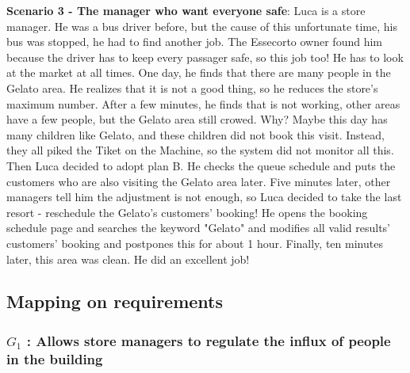 \documentclass[a4paper,12pt]{report}
\begin{document}
\textbf{Scenario 3 - The manager who want everyone safe}: Luca is a store manager. He was a bus driver before, but the cause of this unfortunate time, his bus was stopped, he had to find another job. The Essecorto owner found him because the driver has to keep every passager safe, so this job too! He has to look at the market at all times. One day, he finds that there are many people in the Gelato area. He realizes that it is not a good thing, so he reduces the store's maximum number. After a few minutes,  he finds that is not working, other areas have a few people, but the Gelato area still crowed. Why? Maybe this day has many children like Gelato, and these children did not book this visit. Instead, they all piked the Tiket on the Machine, so the system did not monitor all this. Then Luca decided to adopt plan B. He checks the queue schedule and puts the customers who are also visiting the Gelato area later. Five minutes later, other managers tell him the adjustment is not enough, so Luca decided to take the last resort - reschedule the Gelato's customers' booking! He opens the booking schedule page and searches the keyword "Gelato" and modifies all valid results' customers' booking and postpones this for about 1 hour. Finally, ten minutes later, this area was clean. He did an excellent job!


\subsection{Mapping on requirements}
\subsubsection{$G_1$ : Allows store managers to regulate the influx of people in the building}
\end{document}
